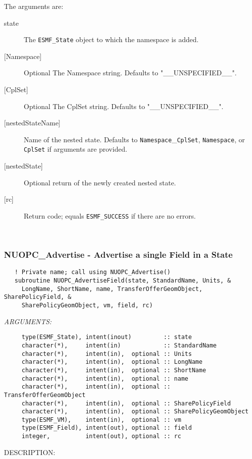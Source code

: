      The arguments are:
     \begin{description}
     \item[state]
       The {\tt ESMF\_State} object to which the namespace is added.
     \item[{[Namespace]}]
       Optional The Namespace string. Defaults to "\_\_UNSPECIFIED\_\_".
     \item[{[CplSet]}]
       Optional The CplSet string. Defaults to "\_\_UNSPECIFIED\_\_".
     \item[{[nestedStateName]}]
       Name of the nested state. Defaults to {\tt Namespace}\_{\tt CplSet},
       {\tt Namespace}, or {\tt CplSet} if arguments are provided.
     \item[{[nestedState]}]
       Optional return of the newly created nested state.
     \item[{[rc]}]
       Return code; equals {\tt ESMF\_SUCCESS} if there are no errors.
     \end{description}
   
 
\mbox{}\hrulefill\ 
 
\subsubsection [NUOPC\_Advertise] {NUOPC\_Advertise - Advertise a single Field in a State}


\begin{verbatim}   ! Private name; call using NUOPC_Advertise() 
   subroutine NUOPC_AdvertiseField(state, StandardName, Units, &
     LongName, ShortName, name, TransferOfferGeomObject, SharePolicyField, &
     SharePolicyGeomObject, vm, field, rc)\end{verbatim}{\em ARGUMENTS:}
\begin{verbatim}     type(ESMF_State), intent(inout)         :: state
     character(*),     intent(in)            :: StandardName
     character(*),     intent(in),  optional :: Units
     character(*),     intent(in),  optional :: LongName
     character(*),     intent(in),  optional :: ShortName
     character(*),     intent(in),  optional :: name
     character(*),     intent(in),  optional :: TransferOfferGeomObject
     character(*),     intent(in),  optional :: SharePolicyField
     character(*),     intent(in),  optional :: SharePolicyGeomObject
     type(ESMF_VM),    intent(in),  optional :: vm
     type(ESMF_Field), intent(out), optional :: field
     integer,          intent(out), optional :: rc\end{verbatim}
{\sf DESCRIPTION:\\ }



